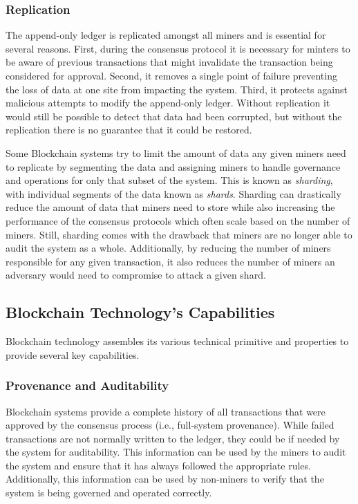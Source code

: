 \subsubsection{Replication}
The append-only ledger is replicated amongst all miners and is essential for several reasons.
First, during the consensus protocol it is necessary for minters to be aware of previous transactions that might invalidate the transaction being considered for approval.
Second, it removes a single point of failure preventing the loss of data at one site from impacting the system.
Third, it protects against malicious attempts to modify the append-only ledger. Without replication it would still be possible to detect that data had been corrupted, but without the replication there is no guarantee that it could be restored.

Some Blockchain systems try to limit the amount of data any given miners need to replicate by segmenting the data and assigning miners to handle governance and operations for only that subset of the system.
This is known as \emph{sharding}, with individual segments of the data known as \emph{shards}.
Sharding can drastically reduce the amount of data that miners need to store while also increasing the performance of the consensus protocols which often scale based on the number of miners.
Still, sharding comes with the drawback that miners are no longer able to audit the system as a whole.
Additionally, by reducing the number of miners responsible for any given transaction, it also reduces the number of miners an adversary would need to compromise to attack a given shard.

\subsection{Blockchain Technology's Capabilities}
Blockchain technology assembles its various technical primitive and properties to provide several key capabilities.

\subsubsection{Provenance and Auditability}
Blockchain systems provide a complete history of all transactions that were approved by the consensus process (i.e., full-system provenance).
While failed transactions are not normally written to the ledger, they could be if needed by the system for auditability.
This information can be used by the miners to audit the system and ensure that it has always followed the appropriate rules.
Additionally, this information can be used by non-miners to verify that the system is being governed and operated correctly.

